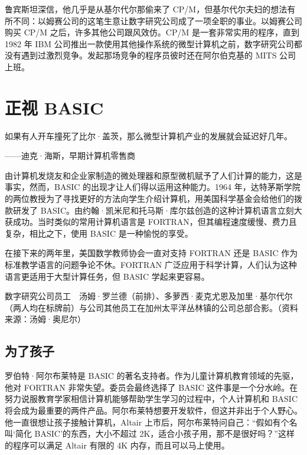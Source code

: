 \documentclass[12pt,UTF8]{ctexbook}
\begin{document}
鲁宾斯坦深信，他几乎是从基尔代尔那偷来了 CP/M，但基尔代尔夫妇的想法有所不同：以姆赛公司的这笔生意让数字研究公司成了一项全职的事业。以姆赛公司购买 CP/M 之后，许多其他公司跟风效仿。CP/M 是一套非常实用的程序，直到 1982 年 IBM 公司推出一款使用其他操作系统的微型计算机之前，数字研究公司都没有遇到过激烈竞争。发起那场竞争的程序员彼时还在阿尔伯克基的 MITS 公司上班。





\section{正视 BASIC}


如果有人开车撞死了比尔·盖茨，那么微型计算机产业的发展就会延迟好几年。

——迪克·海斯，早期计算机零售商



由计算机发烧友和企业家制造的微处理器和原型微机赋予了人们计算的能力，这是事实，然而，BASIC 的出现才让人们得以运用这种能力。1964 年，达特茅斯学院的两位教授为了寻找更好的方法向学生介绍计算机，用美国科学基金会给他们的拨款研发了 BASIC。由约翰·凯米尼和托马斯·库尔兹创造的这种计算机语言立刻大获成功。当时类似的常用计算机语言是 FORTRAN，但其编程速度缓慢、费力且复杂，相比之下，使用 BASIC 是一种愉悦的享受。

在接下来的两年里，美国数学教师协会一直对支持 FORTRAN 还是 BASIC 作为标准教学语言的问题争论不休。FORTRAN 广泛应用于科学计算，人们认为这种语言更适用于大型计算任务，但 BASIC 学起来更容易。



数字研究公司员工　汤姆·罗兰德（前排）、多萝西·麦克尤恩及加里·基尔代尔（两人均在标牌前）与公司其他员工在加州太平洋丛林镇的公司总部合影。（资料来源：汤姆·奥尼尔）





\subsection{为了孩子}


罗伯特·阿尔布莱特是 BASIC 的著名支持者。作为儿童计算机教育领域的先驱，他对 FORTRAN 非常失望。委员会最终选择了 BASIC 这件事是一个分水岭。在努力说服教育学家相信计算机能够帮助学生学习的过程中，个人计算机和 BASIC 将会成为最重要的两件产品。阿尔布莱特想要开发软件，但这并非出于个人野心。他一直很想让孩子接触计算机，Altair 上市后，阿尔布莱特问自己：“假如有个名叫‘简化 BASIC’的东西，大小不超过 2K，适合小孩子用，那不是很好吗？”这样的程序可以满足 Altair 有限的 4K 内存，而且可以马上使用。
\end{document}
